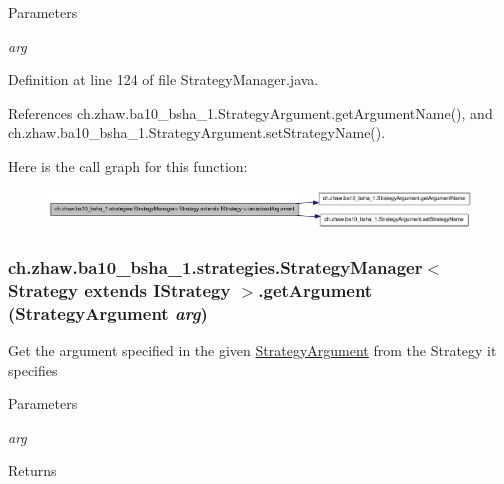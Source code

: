 \begin{DoxyParams}{Parameters}
\item[{\em arg}]\end{DoxyParams}


Definition at line 124 of file StrategyManager.java.

References ch.zhaw.ba10\_\-bsha\_\-1.StrategyArgument.getArgumentName(), and ch.zhaw.ba10\_\-bsha\_\-1.StrategyArgument.setStrategyName().

Here is the call graph for this function:\nopagebreak
\begin{figure}[H]
\begin{center}
\leavevmode
\includegraphics[width=410pt]{classch_1_1zhaw_1_1ba10__bsha__1_1_1strategies_1_1StrategyManager_3_01Strategy_01extends_01IStrategy_01_4_a1bf1d33af692c8658a24d0b935c4f039_cgraph}
\end{center}
\end{figure}
\hypertarget{classch_1_1zhaw_1_1ba10__bsha__1_1_1strategies_1_1StrategyManager_3_01Strategy_01extends_01IStrategy_01_4_adc2e565e79c96210a98da9a84f9d8fbe}{
\subsubsection[{getArgument}]{ ch.zhaw.ba10\_\-bsha\_\-1.strategies.StrategyManager$<$ Strategy extends {\bf IStrategy} $>$.getArgument ({\bf StrategyArgument} {\em arg})}}
\label{classch_1_1zhaw_1_1ba10__bsha__1_1_1strategies_1_1StrategyManager_3_01Strategy_01extends_01IStrategy_01_4_adc2e565e79c96210a98da9a84f9d8fbe}
Get the argument specified in the given \hyperlink{classch_1_1zhaw_1_1ba10__bsha__1_1_1StrategyArgument}{StrategyArgument} from the Strategy it specifies


\begin{DoxyParams}{Parameters}
\item[{\em arg}]\end{DoxyParams}
\begin{DoxyReturn}{Returns}

\end{DoxyReturn}


